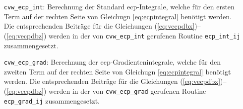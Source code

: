 	\begin{itemize}[leftmargin=77pt]
	\item[\texttt{cvw\_ecp\_int}:] Berechnung der Standard \ac{ecp}-Integrale, welche für den ersten Term auf der rechten Seite von Gleichugn \ref{eq:ecpintegral} benötigt werden. Die entsprechenden Beiträge für die Gleichungen (\ref{eq:vecpdbx})--(\ref{eq:vecpdbz}) werden in der von \texttt{cvw\_ecp\_int} gerufenen Routine \texttt{ecp\_int\_ij} zusammengesetzt.
	\item[\texttt{cvw\_ecp\_grad}:] Berechnung der \ac{ecp}-Gradientenintegrale, welche für den zweiten Term auf der rechten Seite von Gleichugn \ref{eq:ecpintegral} benötigt werden. Die entsprechenden Beiträge für die Gleichungen (\ref{eq:vecpdbx})--(\ref{eq:vecpdbz}) werden in der von \texttt{cvw\_ecp\_grad} gerufenen Routine \texttt{ecp\_grad\_ij} zusammengesetzt.
	\end{itemize} 
	
